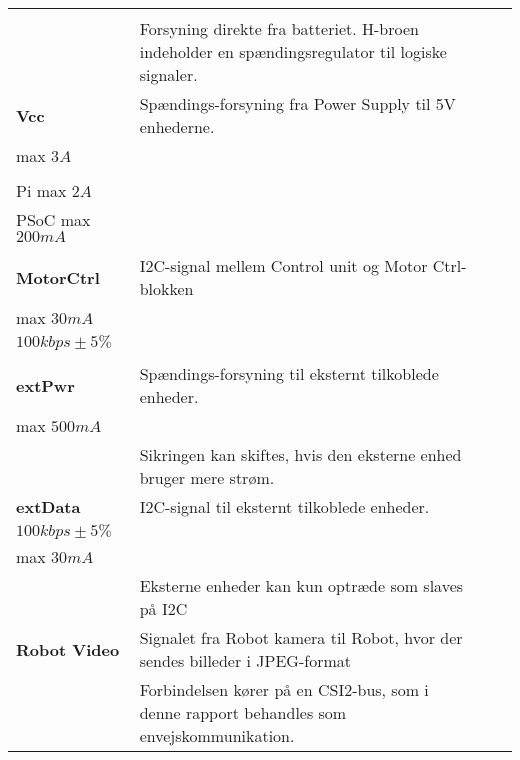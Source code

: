 \begin{longtable}{ p{} p{} p{} p{} }
\begin{tabular}{l}
		$9.6 V \pm 2V$\\
		\end{tabular} & Forsyning direkte fra batteriet. H-broen indeholder en spændingsregulator til logiske signaler.\\\hdashline 
		\textbf{Vcc} & Spændings-forsyning fra Power Supply til 5V enhederne. & 
		\begin{tabular}{l}
		 $5 V \pm 0.5 V$\\
		 max $3 A$\\
		\end{tabular} & 	
		\begin{tabular}{l}
		Sikringer:\\
		 Pi max	$2 A$\\
		 PSoC max $200 mA$\\
		\end{tabular} \\\hdashline
		\textbf{MotorCtrl} & I2C-signal mellem Control unit og Motor Ctrl-blokken  &
		\begin{tabular}{l}
		$ 0-3.3 V \pm 0.5 V $\\
		max $ 30 mA$\\
		$100kbps \pm 5 \%$\\
		\end{tabular}& \phantom{ }  \\\hdashline
		\textbf{extPwr} & Spændings-forsyning til eksternt tilkoblede enheder.  &
		\begin{tabular}{l}
		 $5V \pm 0.5 V$\\
		 max	$500 mA$\\
		\end{tabular} & Sikringen kan skiftes, hvis den eksterne enhed bruger mere strøm. \\\hdashline
		\textbf{extData} & I2C-signal til eksternt tilkoblede enheder. &
		\begin{tabular}{l}
		$0-3.3 V \pm 0.5 V$\\
		$100 kbps \pm 5 \% $\\
		max $ 30 mA$\\
		\end{tabular} & Eksterne enheder kan kun optræde som slaves på I2C \\\hdashline
		\textbf{Robot Video} & Signalet fra Robot kamera til Robot, hvor der sendes billeder i JPEG-format & 
		\begin{tabular}{l}
		max $100 fps$\\
		\end{tabular} & Forbindelsen kører på en CSI2-bus, som i denne rapport behandles som envejskommunikation. \\

\end{longtable}
